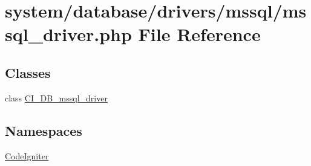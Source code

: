 \hypertarget{mssql__driver_8php}{}\section{system/database/drivers/mssql/mssql\+\_\+driver.php File Reference}
\label{mssql__driver_8php}
\subsection*{Classes}
\begin{DoxyCompactItemize}
\item 
class \mbox{\hyperlink{class_c_i___d_b__mssql__driver}{C\+I\+\_\+\+D\+B\+\_\+mssql\+\_\+driver}}
\end{DoxyCompactItemize}
\subsection*{Namespaces}
\begin{DoxyCompactItemize}
\item 
 \mbox{\hyperlink{namespace_code_igniter}{Code\+Igniter}}
\end{DoxyCompactItemize}
